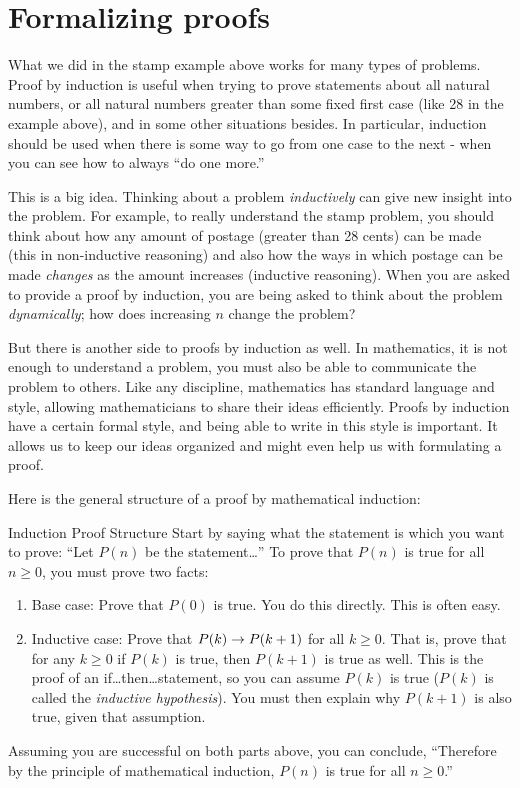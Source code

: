 \documentclass[12pt]{article}
\begin{document}
\section{Formalizing proofs}

What we did in the stamp example above works for many types of problems.  Proof by induction is useful when trying to prove statements about all natural numbers, or all natural numbers greater than some fixed first case (like 28 in the example above), and in some other situations besides.  In particular, induction should be used when there is some way to go from one case to the next - when you can see how to always ``do one more.''

This is a big idea.  Thinking about a problem {\em inductively} can give new insight into the problem.  For example, to really understand the stamp problem, you should think about how any amount of postage (greater than 28 cents) can be made (this in non-inductive reasoning) and also how the ways in which postage can be made {\em changes} as the amount increases (inductive reasoning).  When you are asked to provide a proof by induction, you are being asked to think about the problem {\em dynamically}; how does increasing $n$ change the problem?  

But there is another side to proofs by induction as well.  In mathematics, it is not enough to understand a problem, you must also be able to communicate the problem to others.  Like any discipline, mathematics has standard language and style, allowing mathematicians to share their ideas efficiently.  Proofs by induction have a certain formal style, and being able to write in this style is important.  It allows us to keep our ideas organized and might even help us with formulating a proof.

Here is the general structure of a proof by mathematical induction:

\begin{defbox}{Induction Proof Structure}
Start by saying what the statement is which you want to prove: ``Let $P(n)$ be the statement\ldots''
To prove that $P(n)$ is true for all $n \ge 0$, you must prove two facts:

\begin{enumerate}
  \item Base case: Prove that $P(0)$ is true.  You do this directly.  This is often easy.
  \item Inductive case: Prove that $P(k) \rightarrow P(k+1)$ for all $k \ge 0$.  That is, prove that for any $k \ge 0$ if $P(k)$ is true, then $P(k+1)$ is true as well.  This is the proof of an if\ldots then\ldots statement, so you can assume $P(k)$ is true ($P(k)$ is called the {\em inductive hypothesis}).  You must then explain why $P(k+1)$ is also true, given that assumption.  
\end{enumerate}

Assuming you are successful on both parts above, you can conclude, ``Therefore by the principle of mathematical induction, $P(n)$ is true for all $n \ge 0$.''
\end{defbox}
\end{document}

